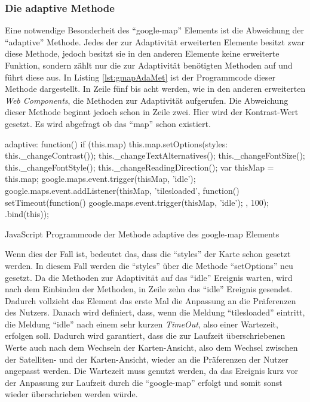 \documentclass[12pt, paper=a4, bibtotoc, toc=listof, headsepline=true, numbers=endperiod]{scrreprt}
\begin{document}
	\subsubsection{Die adaptive Methode}
	Eine notwendige Besonderheit des \enquote{google-map} Elements ist die Abweichung der \enquote{adaptive} Methode. Jedes der zur Adaptivität erweiterten Elemente besitzt zwar diese Methode, jedoch besitzt sie in den anderen Elemente keine erweiterte Funktion, sondern zählt nur die zur Adaptivität benötigten Methoden auf und führt diese aus. In Listing \ref{lst:gmapAdaMet} ist der Programmcode dieser Methode dargestellt. In Zeile fünf bis acht werden, wie in den anderen erweiterten \emph{Web Components}, die Methoden zur Adaptivität aufgerufen. Die Abweichung dieser Methode beginnt jedoch schon in Zeile zwei. Hier wird der Kontrast-Wert gesetzt. Es wird abgefragt ob das \enquote{map} schon existiert.
		\begin{listing}[H]
		\begin{JavaScriptcode*}{}
adaptive: function(){
	if (this.map) {
		this.map.setOptions({styles: this._changeContrast()});
	}
	this._changeTextAlternatives();
	this._changeFontSize();
	this._changeFontStyle();
	this._changeReadingDirection();
	var thisMap = this.map;
	google.maps.event.trigger(thisMap, 'idle');
	google.maps.event.addListener(thisMap, 'tilesloaded', function(){
		setTimeout(function(){
			google.maps.event.trigger(thisMap, 'idle');
		}, 100);
	}.bind(this));
}
		\end{JavaScriptcode*}
		\caption[adaptive Methode der Google Map]{JavaScript Programmcode der Methode adaptive des google-map Elements}
		\label{lst:gmapAdaMet}
	\end{listing}\noindent
	Wenn dies der Fall ist, bedeutet das, dass die \enquote{styles} der Karte schon gesetzt werden. In diesem Fall werden die \enquote{styles} über die Methode \enquote{setOptions} neu gesetzt. Da die Methoden zur Adaptivität auf das \enquote{idle} Ereignis warten, wird nach dem Einbinden der Methoden, in Zeile zehn das \enquote{idle} Ereignis gesendet. Dadurch vollzieht das Element das erste Mal die Anpassung an die Präferenzen des Nutzers. Danach wird definiert, dass, wenn die Meldung \enquote{tilesloaded} eintritt, die Meldung \enquote{idle} nach einem sehr kurzen \emph{TimeOut}, also einer Wartezeit, erfolgen soll. Dadurch wird garantiert, dass die zur Laufzeit überschriebenen Werte auch nach dem Wechseln der Karten-Ansicht, also dem Wechsel zwischen der Satelliten- und der Karten-Ansicht, wieder an die Präferenzen der Nutzer angepasst werden. Die Wartezeit muss genutzt werden, da das Ereignis kurz vor der Anpassung zur Laufzeit durch die \enquote{google-map} erfolgt und somit sonst wieder überschrieben werden würde.
\newpage
\end{document}
